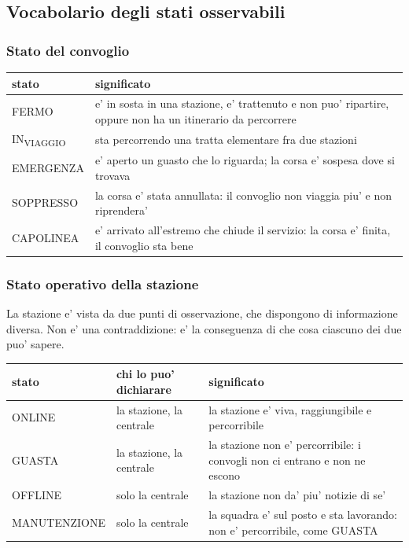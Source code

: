 \documentclass[11pt]{article}
\begin{document}
\subsection{Vocabolario degli stati osservabili}
\label{sec:org8fa74de}

\subsubsection{Stato del convoglio}
\label{sec:org374bf41}

\begin{center}
\begin{tabular}{|p{}|p{}|}
stato & significato\\
\hline
FERMO & e' in sosta in una stazione, e' trattenuto e non puo' ripartire, oppure non ha un itinerario da percorrere\\
IN\textsubscript{VIAGGIO} & sta percorrendo una tratta elementare fra due stazioni\\
EMERGENZA & e' aperto un guasto che lo riguarda; la corsa e' sospesa dove si trovava\\
SOPPRESSO & la corsa e' stata annullata: il convoglio non viaggia piu' e non riprendera'\\
CAPOLINEA & e' arrivato all'estremo che chiude il servizio: la corsa e' finita, il convoglio sta bene\\
\end{tabular}
\end{center}
\subsubsection{Stato operativo della stazione}
\label{sec:org90e6dab}

La stazione e' vista da due punti di osservazione, che dispongono di informazione diversa. Non e' una
contraddizione: e' la conseguenza di che cosa ciascuno dei due puo' sapere.

\begin{center}
\begin{tabular}{|p{}|p{}|p{}|}
stato & chi lo puo' dichiarare & significato\\
\hline
ONLINE & la stazione, la centrale & la stazione e' viva, raggiungibile e percorribile\\
GUASTA & la stazione, la centrale & la stazione non e' percorribile: i convogli non ci entrano e non ne escono\\
OFFLINE & solo la centrale & la stazione non da' piu' notizie di se'\\
MANUTENZIONE & solo la centrale & la squadra e' sul posto e sta lavorando: non e' percorribile, come GUASTA\\
\end{tabular}
\end{center}
\end{document}
